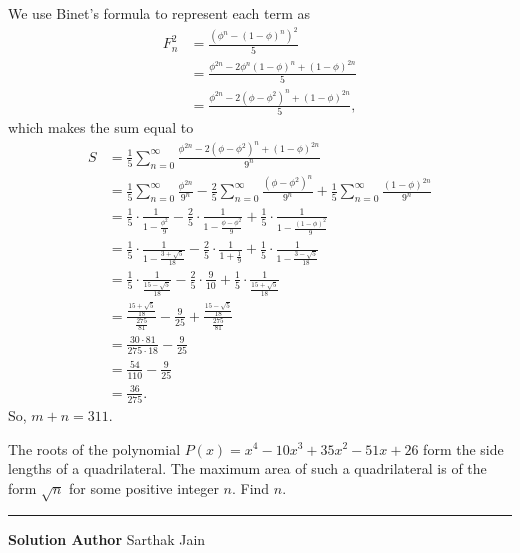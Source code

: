 \documentclass[11pt]{scrartcl}
\newcommand*{\problemfont}{\sffamily\bfseries}
\begin{document}
We use Binet's formula to represent each term as
\begin{align*}
    F_{n}^{2} &= \frac{(\phi^{n} - (1 - \phi)^{n})^{2}}{5} \\
    &= \frac{\phi^{2n} - 2\phi^{n}(1 - \phi)^{n} + (1 - \phi)^{2n}}{5} \\
    &= \frac{\phi^{2n} - 2(\phi - \phi^{2})^{n} + (1 - \phi)^{2n}}{5},
\end{align*}
which makes the sum equal to
\begin{align*}
    S &= \frac{1}{5}\sum_{n = 0}^{\infty} \frac{\phi^{2n} - 2(\phi - \phi^{2})^{n} + (1 - \phi)^{2n}}{9^{n}} \\
    &= \frac{1}{5}\sum_{n = 0}^{\infty} \frac{\phi^{2n}}{9^{n}} - \frac{2}{5}\sum_{n = 0}^{\infty} \frac{(\phi - \phi^{2})^{n}}{9^{n}} + \frac{1}{5}\sum_{n = 0}^{\infty} \frac{(1 - \phi)^{2n}}{9^{n}} \\
    &= \frac{1}{5} \cdot \frac{1}{1 - \frac{\phi^{2}}{9}} - \frac{2}{5} \cdot \frac{1}{1 - \frac{\phi - \phi^{2}}{9}} + \frac{1}{5} \cdot \frac{1}{1 - \frac{(1 - \phi)^{2}}{9}} \\
    &= \frac{1}{5} \cdot \frac{1}{1 - \frac{3 + \sqrt{5}}{18}} - \frac{2}{5} \cdot \frac{1}{1 + \frac{1}{9}} + \frac{1}{5} \cdot \frac{1}{1 - \frac{3 - \sqrt{5}}{18}} \\
    &= \frac{1}{5} \cdot \frac{1}{\frac{15 - \sqrt{5}}{18}} - \frac{2}{5} \cdot \frac{9}{10} + \frac{1}{5} \cdot \frac{1}{\frac{15 + \sqrt{5}}{18}} \\
    &= \frac{\frac{15 + \sqrt{5}}{18}}{\frac{275}{81}} - \frac{9}{25} + \frac{\frac{15 - \sqrt{5}}{18}}{\frac{275}{81}} \\
    &= \frac{30 \cdot 81}{275 \cdot 18} - \frac{9}{25} \\
    &= \frac{54}{110} - \frac{9}{25} \\
    &= \frac{36}{275}.
\end{align*}
So, $m + n = \boxed{311}$.

\pagebreak

\begin{problem}
    The roots of the polynomial $P(x) = x^{4} - 10x^{3} + 35x^{2} - 51x + 26$ form the side lengths of a quadrilateral. The maximum area of such a quadrilateral is of the form $\sqrt{n}$ for some positive integer $n$. Find $n$.
\end{problem}

\vspace{-\baselineskip}\rule{\textwidth}{0.4pt}

{\problemfont Solution Author} Sarthak Jain
\end{document}
